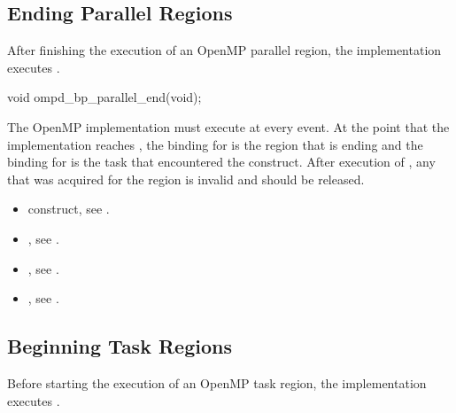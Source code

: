 \subsection{Ending Parallel Regions}
\label{subsubsec:ompd_bp_parallel_end}

\summary
After finishing the execution of an OpenMP parallel region, 
the implementation executes .

\format
\begin{cspecific}
\begin{ompSyntax}
void ompd_bp_parallel_end(void);
\end{ompSyntax}
\end{cspecific}


\descr
The OpenMP implementation must execute  at 
every  event. At the point that the implementation reaches 
, the binding for  
is the  region that is ending and the binding for 
 is the task that encountered the 
 construct. After execution of , any 
 that was acquired for the  region is 
invalid and should be released.

\crossreferences
\begin{itemize}
\item {} construct, see .

\item {}, 
see .

\item {}, 
see .

\item {}, 
see .
\end{itemize}



\subsection{Beginning Task Regions}
\label{subsubsec:ompd_bp_task_begin}

\summary
Before starting the execution of an OpenMP task region, 
the implementation executes .

